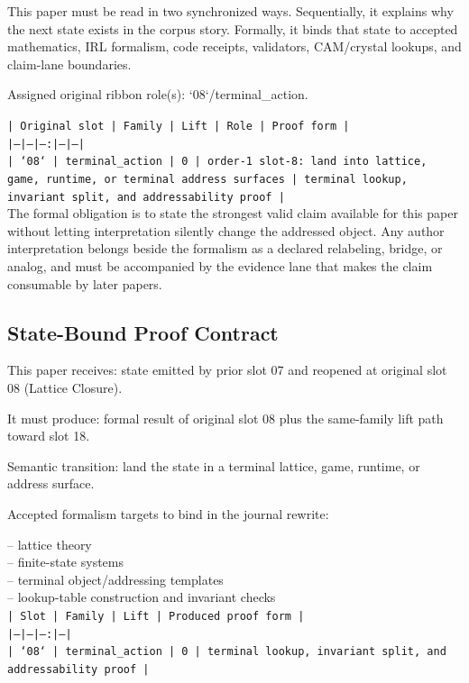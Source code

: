 \documentclass[11pt]{article}
\begin{document}
This paper must be read in two synchronized ways. Sequentially, it explains why
the next state exists in the corpus story. Formally, it binds that state to
accepted mathematics, IRL formalism, code receipts, validators, CAM/crystal
lookups, and claim-lane boundaries.

Assigned original ribbon role(s): `08`/terminal\_action.

\noindent\texttt{| Original slot | Family | Lift | Role | Proof form |}\\
\noindent\texttt{|---|---|---:|---|---|}\\
\noindent\texttt{| `08` | terminal\_action | 0 | order-1 slot-8: land into lattice, game, runtime, or terminal address surfaces | terminal lookup, invariant split, and addressability proof |}\\

The formal obligation is to state the strongest valid claim available for this
paper without letting interpretation silently change the addressed object. Any
author interpretation belongs beside the formalism as a declared relabeling,
bridge, or analog, and must be accompanied by the evidence lane that makes the
claim consumable by later papers.

\subsection*{State-Bound Proof Contract}

This paper receives: state emitted by prior slot 07 and reopened at original slot 08 (Lattice Closure).

It must produce: formal result of original slot 08 plus the same-family lift path toward slot 18.

Semantic transition: land the state in a terminal lattice, game, runtime, or address surface.

Accepted formalism targets to bind in the journal rewrite:

\noindent{}-- lattice theory\\
\noindent{}-- finite-state systems\\
\noindent{}-- terminal object/addressing templates\\
\noindent{}-- lookup-table construction and invariant checks\\

\noindent\texttt{| Slot | Family | Lift | Produced proof form |}\\
\noindent\texttt{|---|---|---:|---|}\\
\noindent\texttt{| `08` | terminal\_action | 0 | terminal lookup, invariant split, and addressability proof |}\\
\end{document}
